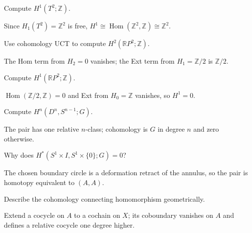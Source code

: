 \begin{problem}[Torus H1]\label{prob:viii28-07}
Compute \(H^1(T^2;\mathbb Z)\).
\end{problem}
\begin{solution}
Since \(H_1(T^2)=\mathbb Z^2\) is free, \(H^1\cong\operatorname{Hom}(\mathbb Z^2,\mathbb Z)\cong\mathbb Z^2\).
\end{solution}

\begin{problem}[RP2 H2]\label{prob:viii28-08}
Use cohomology UCT to compute \(H^2(\mathbb RP^2;\mathbb Z)\).
\end{problem}
\begin{solution}
The Hom term from \(H_2=0\) vanishes; the Ext term from \(H_1=\mathbb Z/2\) is \(\mathbb Z/2\).
\end{solution}

\begin{problem}[RP2 H1]\label{prob:viii28-09}
Compute \(H^1(\mathbb RP^2;\mathbb Z)\).
\end{problem}
\begin{solution}
\(\operatorname{Hom}(\mathbb Z/2,\mathbb Z)=0\) and Ext from \(H_0=\mathbb Z\) vanishes, so \(H^1=0\).
\end{solution}

\begin{problem}\label{prob:viii28-10}
Compute \(H^n(D^n,S^{n-1};G)\).
\end{problem}
\begin{solution}
The pair has one relative \(n\)-class; cohomology is \(G\) in degree \(n\) and zero otherwise.
\end{solution}

\begin{problem}\label{prob:viii28-11}
Why does \(H^*(S^1\times I,S^1\times\{0\};G)=0\)?
\end{problem}
\begin{solution}
The chosen boundary circle is a deformation retract of the annulus, so the pair is homotopy equivalent to \((A,A)\).
\end{solution}

\begin{problem}\label{prob:viii28-12}
Describe the cohomology connecting homomorphism geometrically.
\end{problem}
\begin{solution}
Extend a cocycle on \(A\) to a cochain on \(X\); its coboundary vanishes on \(A\) and defines a relative cocycle one degree higher.
\end{solution}

